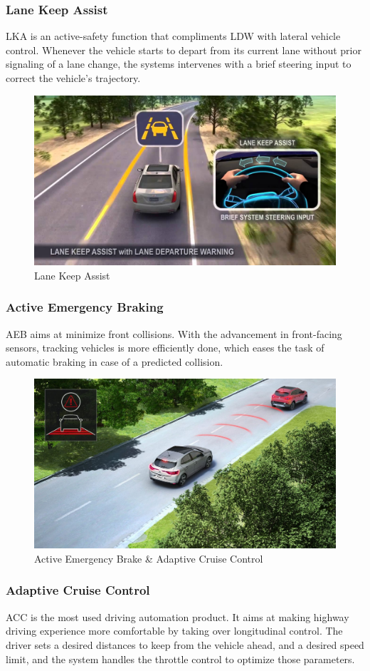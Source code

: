 \subsubsection{Lane Keep Assist}
LKA is an active-safety function that compliments LDW with lateral vehicle control. Whenever the vehicle starts to depart from its current lane without prior signaling of a lane change, the systems intervenes with a brief steering input to correct the vehicle's trajectory.
\begin{figure}[h]
\includegraphics[trim={0 4cm 0 0},clip,width=0.6\linewidth]{Figures/LKA.jpg}
\centering
\caption{Lane Keep Assist}
\end{figure}
\subsubsection{Active Emergency Braking}
AEB aims at minimize front collisions. With the advancement in front-facing sensors, tracking vehicles is more efficiently done, which eases the task of automatic braking in case of a predicted collision.
\begin{figure}[h]
\includegraphics[trim={15cm 4cm 0 0},clip,width=0.5\linewidth]{Figures/AEB.jpg}
\centering
\caption{Active Emergency Brake \& Adaptive Cruise Control}
\end{figure}
\subsubsection{Adaptive Cruise Control}
ACC is the most used driving automation product. It aims at making highway driving experience more comfortable by taking over longitudinal control. The driver sets a desired distances to keep from the vehicle ahead, and a desired speed limit, and the system handles the throttle control to optimize those parameters.
\pagebreak
